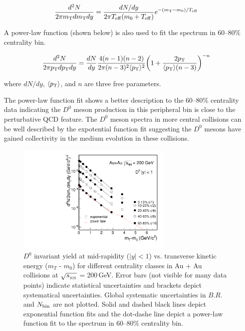 \begin{equation}
\frac{d^2N}{2\pi m_{\rm T}dm_{\rm T}dy} = \frac{dN/dy}{2\pi T_{\rm eff}(m_0+T_{\rm eff})}e^{-(m_{\rm T}-m_0)/T_{\rm eff}}
\end{equation}

A power-law function (shown below) is also used to fit the spectrum in 60--80\% centrality bin. 

\begin{equation}
\frac{d^2N}{2\pi p_{\rm T}dp_{\rm T}dy} = \frac{dN}{dy}\frac{4(n-1)(n-2)}{2\pi (n-3)^2\langle p_{\rm T} \rangle ^2}\bigg(1+\frac{2p_{\rm T}}{\langle p_{\rm T} \rangle (n-3)}\bigg)^{-n}
\end{equation}

where $dN/dy$, $\langle p_{\rm T}\rangle$, and $n$ are three free parameters. 

The power-law function fit shows a better description to the 60--80\% centrality data indicating the $D^0$ meson production in this peripheral bin is close to the perturbative QCD feature. The $D^0$ meson spectra in more central collisions can be well described by the expotential function fit suggesting the $D^0$ mesons have gained collectivity in the medium evolution in these collisions.

\begin{figure}
\centering
\includegraphics[width=0.68\textwidth]{figure/Run14_D0HFT/mTFit_D0.pdf}
\caption{$D^{0}$ invariant yield at mid-rapidity ($|y|<1$) vs. transverse kinetic energy ($m_{T}$ - $m_{0}$) for different centrality classes in Au + Au collisions at $\sqrt{s_{_{\rm NN}}}$ = 200\,GeV. Error bars (not visible for many data points) indicate statistical uncertainties and brackets depict systematical uncertainties. Global systematic uncertainties in $B.R.$ and $N_{\rm bin}$ are not plotted. Solid and dashed black lines depict exponential function fits and the dot-dashe line depict a power-law function fit to the spectrum in 60--80\% centrality bin.}
\label{figure:mTFit_D0} 
\end{figure}

